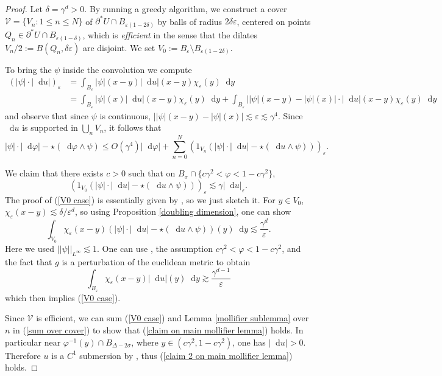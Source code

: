 \documentclass[reqno,10pt]{amsart}
\newcommand*\dif{\mathop{}\!\mathrm{d}}
\newcommand{\dfn}[1]{\emph{#1}\index{#1}}
\theoremstyle{definition}
\numberwithin{equation}{section}
\begin{document}
\begin{proof}
Let $\delta = \gamma^d > 0$.
By running a greedy algorithm, we construct a cover $\mathcal V = \{V_n: 1 \leq n \leq N\}$ of $\partial^* U \cap B_{\varepsilon(1 - 2\delta)}$ by balls of radius $2\delta\varepsilon$, centered on points $Q_n \in \partial^* U \cap B_{\varepsilon(1 - \delta)}$, which is \dfn{efficient} in the sense that the dilates $V_n/2 := B(Q_n, \delta\varepsilon)$ are disjoint.
We set $V_0 := B_\varepsilon \setminus B_{\varepsilon(1 - 2\delta)}$.

To bring the $\psi$ inside the convolution we compute
\begin{align*}
(|\psi| \cdot |\dif u|)_\varepsilon
&= \int_{B_\varepsilon} |\psi|(x - y) |\dif u|(x - y) \chi_\varepsilon(y) \dif y \\
&= \int_{B_\varepsilon} |\psi|(x) |\dif u|(x - y) \chi_\varepsilon(y) \dif y + \int_{B_\varepsilon} ||\psi|(x - y) - |\psi|(x)| \cdot |\dif u|(x - y) \chi_\varepsilon(y) \dif y
\end{align*}
and observe that since $\psi$ is continuous, $||\psi|(x - y) - |\psi|(x)| \lesssim \varepsilon \lesssim \gamma^4$.
Since $\dif u$ is supported in $\bigcup_n V_n$, it follows that
\begin{equation}\label{sum over cover}
|\psi| \cdot |\dif \varphi| - \star(\dif \varphi \wedge \psi)
\leq O(\gamma^4) |\dif \varphi| + \sum_{n=0}^N (1_{V_n}(|\psi| \cdot |\dif u| - \star(\dif u \wedge \psi)))_\varepsilon.
\end{equation}

We claim that there exists $c > 0$ such that on $B_\sigma \cap \{c\gamma^2 < \varphi < 1 - c\gamma^2\}$,
\begin{equation}\label{V0 case}
(1_{V_0}(|\psi| \cdot |\dif u| - \star(\dif u \wedge \psi)))_\varepsilon \lesssim \gamma |\dif u|_\varepsilon.
\end{equation}
The proof of (\ref{V0 case}) is essentially given by \cite[pg92]{Giusti77}, so we just sketch it.
For $y \in V_0$, $\chi_\varepsilon(x - y) \lesssim \delta/\varepsilon^d$, so using Proposition \ref{doubling dimension}, one can show
$$\int_{V_0} \chi_\varepsilon(x - y)(|\psi| \cdot |\dif u| - \star(\dif u \wedge \psi))(y) \dif y \lesssim \frac{\gamma^d}{\varepsilon}.$$
Here we used $||\psi||_{L^\infty} \lesssim 1$.
One can use \cite[Lemma 7.1]{Giusti77}, the assumption $c\gamma^2 < \varphi < 1 - c\gamma^2$, and the fact that $g$ is a perturbation of the euclidean metric to obtain
$$\int_{B_\varepsilon} \chi_\varepsilon(x - y) |\dif u|(y) \dif y \gtrsim \frac{\gamma^{d - 1}}{\varepsilon}$$
which then implies (\ref{V0 case}).

Since $\mathcal V$ is efficient, we can sum (\ref{V0 case}) and Lemma \ref{mollifier sublemma} over $n$ in (\ref{sum over cover}) to show that (\ref{claim on main mollifier lemma}) holds.
In particular near $\varphi^{-1}(y) \cap B_{\Delta - 2\sigma}$, where $y \in (c\gamma^2, 1 - c\gamma^2)$, one has $|\dif u| > 0$.
Therefore $u$ is a $C^1$ submersion by \cite[Lemma 7.1]{Giusti77}, thus (\ref{claim 2 on main mollifier lemma}) holds.
\end{proof}
\end{document}
